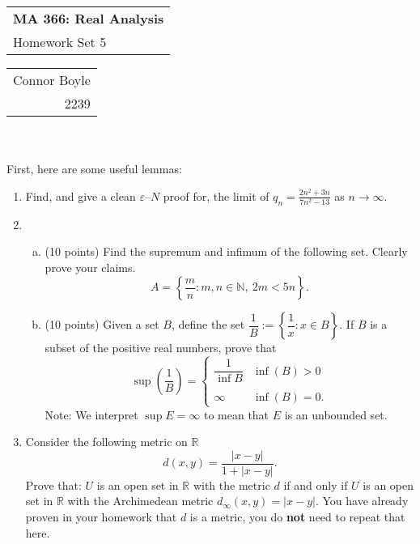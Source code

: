 \documentclass{amsart}
\def\name{Connor Boyle} %
\def\CM{2239} %
\def\hwnum{5} %
\begin{document}
\noindent
\thispagestyle{firststyle}
\begin{tabular}{l}
{\LARGE \textbf{MA 366: Real Analysis} }\\
{\Large Homework Set \hwnum}
\end{tabular} \hfill \begin{tabular}{r}
                        \name \\
                        \CM
                        \end{tabular}

\noindent \hrulefill \\\\
First, here are some useful lemmas:

\begin{enumerate}[1.]
\item Find, and give a clean $\varepsilon$--$N$ proof for, the limit of $\displaystyle  q_n=\frac{2n^2+3n}{7n^2-13}$ as $n \to \infty$.


\newpage

\item  \begin{enumerate}[(a)]
	\item (10 points) Find the supremum and infimum of the following set.
	Clearly prove your claims.
	\[ A = \left\{ \frac{m}{n} : m,n \in \mathbb N,\ 2m<5n \right\}. \]
	\item (10 points) Given a set $B$, define the set $\dfrac{1}{B} := \left\{\dfrac{1}{x} : x \in B \right\}$. If $B$ is a subset of the positive real numbers, prove that
	\[ \sup \left(\frac{1}{B} \right) = \begin{cases}
                                            \dfrac{1}{\inf B} & \inf(B) > 0 \\
	                                                          & \\
	                                        \infty            & \inf(B) = 0.
	\end{cases}
	\]
Note: We interpret $\sup E = \infty$ to mean that $E$ is an unbounded set.
\end{enumerate}

\newpage
\item Consider the following metric on $\mathbb R$
\[ d(x,y)=\frac{|x-y|}{1+|x-y|}. \]
Prove that: $U$ is an open set in $\mathbb R$ with the metric $d$ if and only if $U$ is an open
set in $\mathbb R$ with the Archimedean metric $d_{\infty}(x,y)=|x-y|$. You have already proven in your homework that $d$ is a metric, you do \textbf{not} need to repeat that here.


\end{enumerate}
\end{document}
